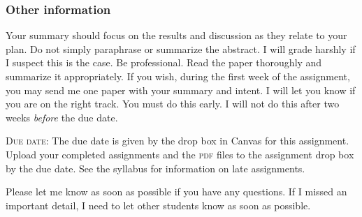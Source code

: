 \documentclass[12pt]{article}
\begin{document}
\subsubsection*{Other information}

Your summary should focus on the results and discussion as they relate to your plan. Do not simply paraphrase or summarize the abstract. I will grade harshly if I suspect this is the case. Be professional. Read the paper thoroughly and summarize it appropriately. If you wish, during the first week of the assignment, you may send me one paper with your summary and intent. I will let you know if you are on the right track. You must do this early. I will not do this after two weeks \emph{before} the due date.

\textsc{Due date:} The due date is given by the drop box in Canvas for this assignment. Upload your completed assignments and the \textsc{pdf} files to the assignment drop box by the due date. See the syllabus for information on late assignments.

\vspace*{\baselineskip}

Please let me know as soon as possible if you have any questions. If I missed an important detail, I need to let other students know as soon as possible.
\end{document}
